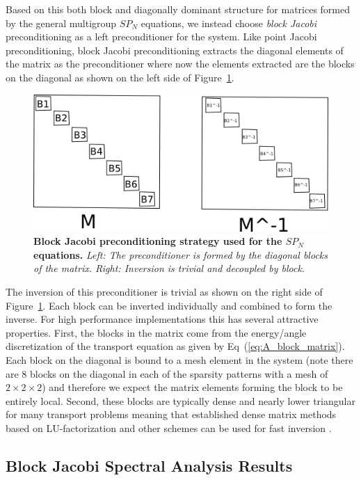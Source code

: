 Based on this both block and diagonally dominant structure for
matrices formed by the general multigroup $SP_N$ equations, we instead
choose \textit{block Jacobi} preconditioning as a left preconditioner
for the system. Like point Jacobi preconditioning, block Jacobi
preconditioning extracts the diagonal elements of the matrix as the
preconditioner where now the elements extracted are the blocks on the
diagonal as shown on the left side of
Figure~\ref{fig:block_jacobi_ex}.
\begin{figure}[t!]
  \begin{center}
    \includegraphics[width=5in]{chapters/spn_equations/block_preconditioning.png}
  \end{center}
  \caption{\textbf{Block Jacobi preconditioning strategy used for the
      $SP_N$ equations.} \textit{Left: The preconditioner is formed by
      the diagonal blocks of the matrix. Right: Inversion is trivial
      and decoupled by block.}}
  \label{fig:block_jacobi_ex}
\end{figure}
The inversion of this preconditioner is trivial as shown on the right
side of Figure~\ref{fig:block_jacobi_ex}. Each block can be inverted
individually and combined to form the inverse. For high performance
implementations this has several attractive properties. First, the
blocks in the matrix come from the energy/angle discretization of the
transport equation as given by Eq~(\ref{eq:A_block_matrix}). Each
block on the diagonal is bound to a mesh element in the system (note
there are 8 blocks on the diagonal in each of the sparsity patterns
with a mesh of $2 \times 2 \times 2$) and therefore we expect the
matrix elements forming the block to be entirely local. Second, these
blocks are typically dense and nearly lower triangular for many
transport problems meaning that established dense matrix methods based
on LU-factorization and other schemes can be used for fast inversion
\citep{lapack_citation}.

\subsection{Block Jacobi Spectral Analysis Results}
\label{subsec:spn_analysis_results}
